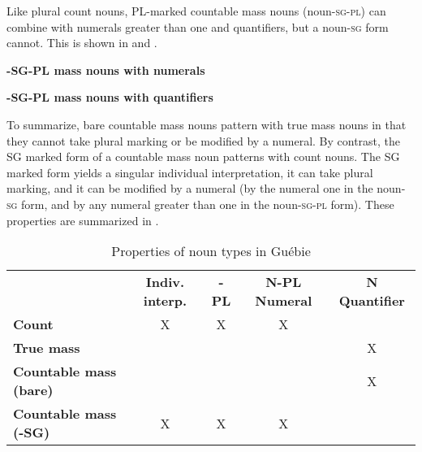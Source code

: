 \documentclass[output=paper,colorlinks,citecolor=brown]{langscibook}
\begin{document}
Like plural count nouns, PL-marked countable mass nouns (noun-\textsc{sg-pl}) can combine with numerals greater than one and quantifiers, but a noun-\textsc{sg} form cannot. This is shown in  and .

\ea%
    \label{ex:sande:11}
    \textbf{-\textsc{SG-PL} mass nouns with numerals}
    \z
\z

\ea%
    \label{ex:sande:12}
    \textbf{-\textsc{SG-PL} mass nouns with quantifiers}
    \z
\z

To summarize, bare countable mass nouns pattern with true mass nouns in that they cannot take plural marking or be modified by a numeral. By contrast, the SG marked form of a countable mass noun patterns with count nouns. The SG marked form yields a singular individual interpretation, it can take plural marking, and it can be modified by a numeral (by the numeral one in the noun-\textsc{sg} form, and by any numeral greater than one in the noun\textsc{-sg-pl} form). These properties are summarized in .

\begin{table}
	\begin{tabular}{lcccc}
    	& \textbf{Indiv. interp.} & \textbf{-PL} & \textbf{N-PL Numeral} & \textbf{N Quantifier} \\
    	\lsptoprule
    	\textbf{Count} & X & X & X & \\
    	\textbf{True mass} & & & & X\\
    	\textbf{Countable mass (bare)} & & & & X\\
    	\textbf{Countable mass (-SG)} & X & X & X & \\
	\end{tabular}
    \caption{Properties of noun types in Guébie}
    \label{tab:sande:5}
\end{table}
\end{document}
